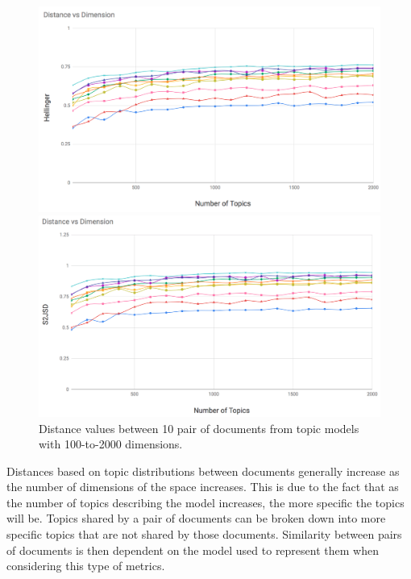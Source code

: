 \begin{figure}
\begin{adjustbox}{minipage=0.45\linewidth,frame=1pt 5pt}
\end{adjustbox}
\hfill
\begin{adjustbox}{minipage=0.45\linewidth,frame=1pt 5pt}
\includegraphics[width=\linewidth]{He_100_2k.png}
\end{adjustbox}
\hfill
\begin{adjustbox}{minipage=0.45\linewidth,frame=1pt 5pt}
\includegraphics[width=\linewidth]{S2JSD_100_2k.png}
\end{adjustbox}
\caption{Distance values between 10 pair of documents from topic models with 100-to-2000 dimensions.}
\label{fig:topic_distances}
\end{figure}

Distances based on topic distributions between documents generally increase as the number of dimensions of the space increases. This is due to the fact that as the number of topics describing the model increases, the more specific the topics will be. Topics shared by a pair of documents can be broken down into more specific topics that are not shared by those documents. Similarity between pairs of documents is then dependent on the model used to represent them when considering this type of metrics. 


